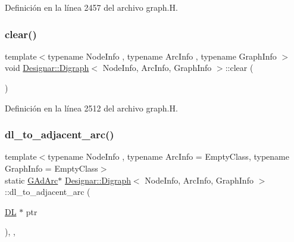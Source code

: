 Definición en la línea 2457 del archivo graph.\+H.

\mbox{\label{class_designar_1_1_digraph_a1ec067a8df6129b27e4d79c9c2755899}} 
\subsubsection{\texorpdfstring{clear()}{clear()}}
{\footnotesize\ttfamily template$<$typename Node\+Info , typename Arc\+Info , typename Graph\+Info $>$ \\
void \hyperlink{class_designar_1_1_digraph}{Designar\+::\+Digraph}$<$ Node\+Info, Arc\+Info, Graph\+Info $>$\+::clear (\begin{DoxyParamCaption}{ }\end{DoxyParamCaption})}



Definición en la línea 2512 del archivo graph.\+H.

\mbox{\label{class_designar_1_1_digraph_afe3162bf2e56b177e7ee1a938ae2af8b}} 
\subsubsection{\texorpdfstring{dl\+\_\+to\+\_\+adjacent\+\_\+arc()}{dl\_to\_adjacent\_arc()}}
{\footnotesize\ttfamily template$<$typename Node\+Info , typename Arc\+Info  = Empty\+Class, typename Graph\+Info  = Empty\+Class$>$ \\
static \hyperlink{class_designar_1_1_digraph_a0c6d846f23d1e82556fb6055557df53f}{G\+Ad\+Arc}$\ast$ \hyperlink{class_designar_1_1_digraph}{Designar\+::\+Digraph}$<$ Node\+Info, Arc\+Info, Graph\+Info $>$\+::dl\+\_\+to\+\_\+adjacent\+\_\+arc (\begin{DoxyParamCaption}\item[{\hyperlink{class_designar_1_1_d_l}{DL} $\ast$}]{ptr }\end{DoxyParamCaption})\hspace{0.3cm}{\ttfamily [inline]}, {\ttfamily [static]}, {\ttfamily [protected]}}



